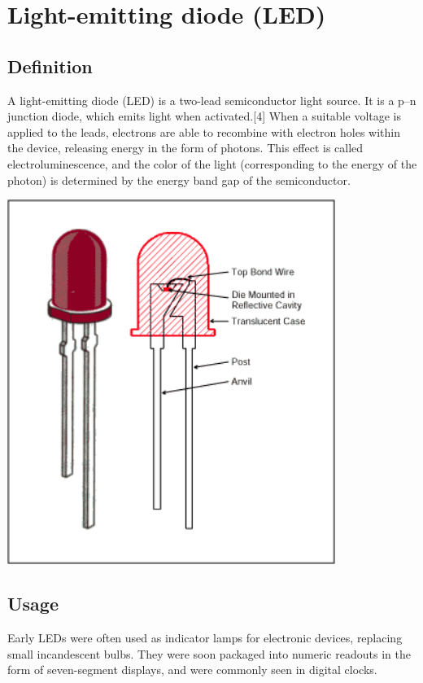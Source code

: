 \section{Light-emitting diode (LED)}

\subsection{Definition}
A light-emitting diode (LED) is a two-lead semiconductor light source. It is a p–n junction diode, which emits light when activated.[4] When a suitable voltage is applied to the leads, electrons are able to recombine with electron holes within the device, releasing energy in the form of photons. This effect is called electroluminescence, and the color of the light (corresponding to the energy of the photon) is determined by the energy band gap of the semiconductor.\\


\centerline{
	\centering
	\includegraphics[width=0.8\textwidth]{overview/images/led.png}
}


\subsection{Usage}
Early LEDs were often used as indicator lamps for electronic devices, replacing small incandescent bulbs. They were soon packaged into numeric readouts in the form of seven-segment displays, and were commonly seen in digital clocks.

